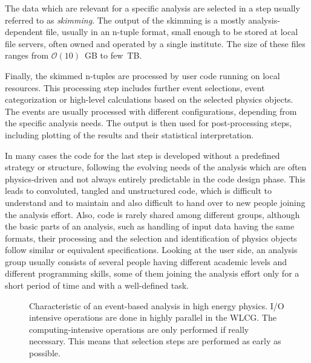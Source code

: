 \documentclass[3p]{elsarticle}
\begin{document}
The data which are relevant for a specific analysis are selected in a step usually referred to as \textit{skimming}. The output of the skimming is a mostly analysis-dependent file, usually in an n-tuple format, small enough to be stored at local file servers, often owned and operated by a single institute. The size of these files ranges from $\mathcal O(10)$~GB to few~TB.

Finally, the skimmed n-tuples are processed by user code running on local resources. This processing step includes further event selections, event categorization or high-level calculations based on the selected physics objects. The events are usually processed with different configurations, depending from the specific analysis needs. The output is then used for post-processing steps, including plotting of the results and their statistical interpretation.

In many cases the code for the last step is developed without a predefined strategy or structure, following the evolving needs of the analysis which are often physics-driven and not always entirely predictable in the code design phase. This leads to convoluted, tangled and unstructured code, which is difficult to understand and to maintain and also difficult to hand over to new people joining the analysis effort. Also, code is rarely shared among different groups, although the basic parts of an analysis, such as handling of input data having the same formats, their processing and the selection and identification of physics objects follow similar or equivalent specifications. Looking at the user side, an analysis group usually consists of several people having different academic levels and different programming skills, some of them joining the analysis effort only for a short period of time and with a well-defined task.

\begin{figure}[p]
\centering 
\caption[Characteristics of an event-based analysis in high energy physics]{Characteristic of an event-based analysis in high energy physics.
I/O intensive operations are done in highly parallel in the WLCG.
The computing-intensive operations are only performed if really necessary.
This means that selection steps are performed as early as possible.}
\label{figure_analysis_steps}
\end{figure}
\clearpage
\end{document}
